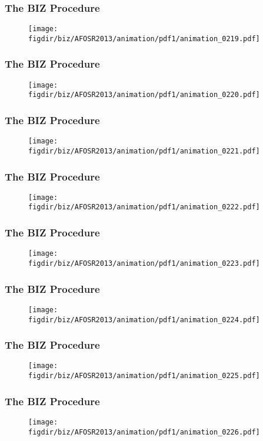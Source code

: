 \documentclass[13pt]{beamer}
\newcommand{\figdir}{../../fig}
\begin{document}
{\begin{frame}\frametitle{The BIZ Procedure}\begin{figure}\texttt{[image: \\figdir/biz/AFOSR2013/animation/pdf1/animation\_0219.pdf]}\end{figure}\end{frame}
\begin{frame}\frametitle{The BIZ Procedure}\begin{figure}\texttt{[image: \\figdir/biz/AFOSR2013/animation/pdf1/animation\_0220.pdf]}\end{figure}\end{frame}
\begin{frame}\frametitle{The BIZ Procedure}\begin{figure}\texttt{[image: \\figdir/biz/AFOSR2013/animation/pdf1/animation\_0221.pdf]}\end{figure}\end{frame}
\begin{frame}\frametitle{The BIZ Procedure}\begin{figure}\texttt{[image: \\figdir/biz/AFOSR2013/animation/pdf1/animation\_0222.pdf]}\end{figure}\end{frame}
\begin{frame}\frametitle{The BIZ Procedure}\begin{figure}\texttt{[image: \\figdir/biz/AFOSR2013/animation/pdf1/animation\_0223.pdf]}\end{figure}\end{frame}
\begin{frame}\frametitle{The BIZ Procedure}\begin{figure}\texttt{[image: \\figdir/biz/AFOSR2013/animation/pdf1/animation\_0224.pdf]}\end{figure}\end{frame}
\begin{frame}\frametitle{The BIZ Procedure}\begin{figure}\texttt{[image: \\figdir/biz/AFOSR2013/animation/pdf1/animation\_0225.pdf]}\end{figure}\end{frame}
\begin{frame}\frametitle{The BIZ Procedure}\begin{figure}\texttt{[image: \\figdir/biz/AFOSR2013/animation/pdf1/animation\_0226.pdf]}\end{figure}\end{frame}
}
\end{document}
